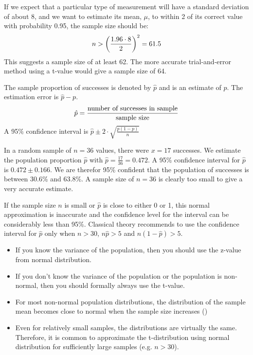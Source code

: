 \begin{example}
    If we expect that a particular type of measurement will have a standard deviation of about 8, and we want to estimate its mean, $\mu$, to within 2 of its correct value with probability 0.95, the sample size should be:
    \begin{align}
        n>\left(\frac{1.96\cdot 8}{2}\right)^2 = 61.5\notag
    \end{align}
    This suggests a sample size of at least 62. The more accurate trial-and-error method using a t-value would give a sample size of 64.
\end{example}

The sample proportion of successes is denoted by $\hat{p}$ and is an estimate of $p$. The estimation error is $\hat{p}-p$.
\begin{align}
    \hat{p} = \frac{\text{number of successes in sample}}{\text{sample size}} \notag
\end{align}
A 95\% confidence interval is $\hat{p} \pm 2\cdot\sqrt{\frac{p(1-p)}{n}}$

\begin{example}
    In a random sample of $n=36$ values, there were $x=17$ successes. We estimate the population proportion $\hat{p}$ with $\hat{p}=\frac{17}{36}=0.472$. A 95\% confidence interval for $\hat{p}$ is $0.472\pm 0.166$. We are therefor 95\% confident that the population of successes is between 30.6\% and 63.8\%. A sample size of $n=36$ is clearly too small to give a very accurate estimate.
    
    If the sample  size $n$ is small or $\hat{p}$ is close to either 0 or 1, this normal approximation is inaccurate and the confidence level for the interval can be considerably less than 95\%. Classical theory recommends to use the confidence interval for $\hat{p}$ only when $n>30$, $n\hat{p}>5$ and $n(1-\hat{p})>5$.
\end{example}

\begin{*anmerkung}
    \begin{itemize}
        \item If you know the variance of the population, then you should use the z-value from normal distribution.
        \item If you don't know the variance of the population or the population is non-normal, then you should formally always use the t-value.
        \item For most non-normal population distributions, the distribution of the sample mean becomes close to normal when the sample size increases ()
        \item Even for relatively small samples, the distributions are virtually the same. Therefore, it is common to approximate the t-distribution using normal distribution for sufficiently large samples (e.g. $n>30$).
    \end{itemize}
\end{*anmerkung}

